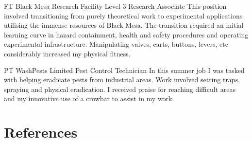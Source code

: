 \documentclass[10pt]{article} %
\begin{document}
\begin{paracol}{2}

{FT} %
{Black Mesa Research Facility} %
{Level 3 Research Associate} %
{This position involved transitioning from purely theoretical work to experimental applications utilising the immense resources of Black Mesa. The transition required an initial learning curve in hazard containment, health and safety procedures and operating experimental infrastructure. Manipulating valves, carts, buttons, levers, etc considerably increased my physical fitness.}  %


{PT} %
{WashPests Limited} %
{Pest Control Technician} %
{In this summer job I was tasked with helping eradicate pests from industrial areas. Work involved setting traps, spraying and physical eradication. I received praise for reaching difficult areas and my innovative use of a crowbar to assist in my work.} %


\vspace{-\baselineskip}\medskip %


\section{References}







\end{paracol}
\end{document}
